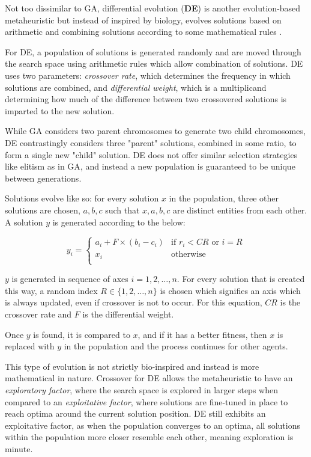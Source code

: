 \documentclass[a4paper,12pt]{article}
\begin{document}
Not too dissimilar to GA, differential evolution (\textbf{DE}) is another evolution-based metaheuristic but instead of inspired by biology, evolves solutions based on arithmetic and combining solutions according to some mathematical rules \cite{de}.

For DE, a population of solutions is generated randomly and are moved through the search space using arithmetic rules which allow combination of solutions. DE uses two parameters: \textit{crossover rate}, which determines the frequency in which solutions are combined, and \textit{differential weight}, which is a multiplicand determining how much of the difference between two crossovered solutions is imparted to the new solution.

While GA considers two parent chromosomes to generate two child chromosomes, DE contrastingly considers three "parent" solutions, combined in some ratio, to form a single new "child" solution. DE does not offer similar selection strategies like elitism as in GA, and instead a new population is guaranteed to be unique between generations.

Solutions evolve like so: for every solution $x$ in the population, three other solutions are chosen, $a, b, c$ such that $x, a, b, c$ are distinct entities from each other. A solution $y$ is generated according to the below:

\[
  y_i =
  \begin{cases}
    a_i + F \times (b_i - c_i) & \text{if $r_i < CR$ or $i = R$} \\
    x_i & \text{otherwise} \\
  \end{cases}
\]

$y$ is generated in sequence of axes $i = 1, 2, \dots, n$. For every solution that is created this way, a random index $R \in \{1, 2, \dots, n\}$ is chosen which signifies an axis which is always updated, even if crossover is not to occur. For this equation, $CR$ is the crossover rate and $F$ is the differential weight.

Once $y$ is found, it is compared to $x$, and if it has a better fitness, then $x$ is replaced with $y$ in the population and the process continues for other agents.

This type of evolution is not strictly bio-inspired and instead is more mathematical in nature. Crossover for DE allows the metaheuristic to have an \textit{exploratory factor}, where the search space is explored in larger steps when compared to an \textit{exploitative factor}, where solutions are fine-tuned in place to reach optima around the current solution position. DE still exhibits an exploitative factor, as when the population converges to an optima, all solutions within the population more closer resemble each other, meaning exploration is minute.
\end{document}
